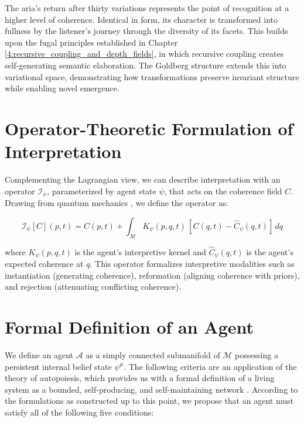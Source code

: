 The aria's return after thirty variations represents the point of recognition at a higher level of coherence. Identical in form, its character is transformed into fullness by the listener's journey through the diversity of its facets. This builds upon the fugal principles established in Chapter \ref{4:recursive_coupling_and_depth_fields}, in which recursive coupling creates self-generating semantic elaboration. The Goldberg structure extends this into variational space, demonstrating how transformations preserve invariant structure while enabling novel emergence.


\section{Operator-Theoretic Formulation of Interpretation}
\label{13.4:operator_theoretic_formulation_of_interpretation}

Complementing the Lagrangian view, we can describe interpretation with an operator \(\mathcal{I}_{\psi}\), parameterized by agent state \(\psi\), that acts on the coherence field \(C\). Drawing from quantum mechanics \autocite{vonNeumann1955}, we define the operator as:

\begin{equation}
\mathcal{I}_{\psi}[C](p, t) = C(p, t) + \int_{\mathcal{M}} K_{\psi}(p, q, t)\, [C(q, t) - \hat{C}_{\psi}(q, t)]\, dq
\end{equation}

where \(K_{\psi}(p, q, t)\) is the agent's interpretive kernel and \(\hat{C}_{\psi}(q, t)\) is the agent's expected coherence at \(q\). This operator formalizes interpretive modalities such as instantiation (generating coherence), reformation (aligning coherence with priors), and rejection (attenuating conflicting coherence).


\section{Formal Definition of an Agent}
\label{13.5:formal_definition_of_an_agent}

We define an agent \(\mathcal{A}\) as a simply connected submanifold of \(\mathcal{M}\) possessing a persistent internal belief state \(\psi^\mu\). The following criteria are an application of the theory of autopoiesis, which provides us with a formal definition of a living system as a bounded, self-producing, and self-maintaining network \autocite{MaturanaVarela1980}. According to the formulations as constructed up to this point, we propose that an agent must satisfy all of the following five conditions:

